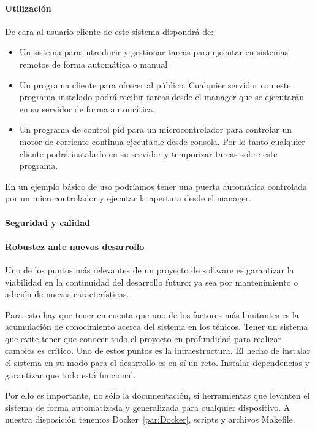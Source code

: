 \paragraph{Utilización}
    De cara al usuario cliente de este sistema dispondrá de:
    \begin{itemize}
        \item Un sistema para introducir y gestionar tareas para ejecutar en sistemas remotos de forma automática o manual
        \item Un programa cliente para ofrecer al público. Cualquier servidor con este programa instalado podrá recibir tareas desde el manager que se ejecutarán en su servidor de forma automática.
        \item Un programa de control pid para un microcontrolador para controlar un motor de corriente continua ejecutable desde consola. Por lo tanto cualquier cliente podrá instalarlo en su servidor y temporizar tareas sobre este programa.
    \end{itemize}

En un ejemplo básico de uso podríamos tener una puerta automática controlada por un microcontrolador y ejecutar la apertura desde el manager.

\paragraph{Seguridad y calidad}\label{par:testing}
    
\paragraph{Robustez ante nuevos desarrollo}

Uno de los puntos más relevantes de un proyecto de software es garantizar la viabilidad en la continuidad del desarrollo futuro; ya sea por mantenimiento o adición de nuevas características.

Para esto hay que tener en cuenta que uno de los factores más limitantes es la acumulación de conocimiento acerca del sistema en los ténicos. Tener un sistema que evite tener que conocer todo el proyecto en profundidad para realizar cambios es crítico. Uno de estos puntos es la infraestructura. El hecho de instalar el sistema en su modo para el desarrollo es en sí un reto. Instalar dependencias y garantizar que todo está funcional.

Por ello es importante, no sólo la documentación, si herramientas que levanten el sistema de forma automatizada y generalizada para cualquier dispositivo. A nuestra disposición tenemos Docker~\ref{par:Docker}, scripts y archivos Makefile.

